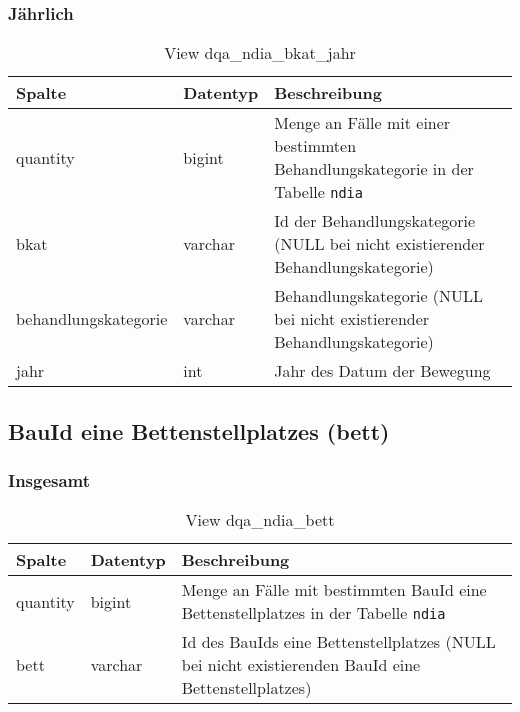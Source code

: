 \subsubsection{Jährlich} \label{subsubsec:behKatJ}

\begin{table}[ht]
	\centering   
	\caption{View dqa\_ndia\_bkat\_jahr}
	\label{tab:beweBkatJahr}
	\begin{tabular}{||l|l|p{10cm}||}   		
		\hline
		Spalte & Datentyp & Beschreibung \\ [0.5ex]
		\hline\hline
		quantity & bigint & Menge an Fälle mit einer bestimmten Behandlungskategorie in der Tabelle \texttt{ndia} \\
		\hline
		bkat & varchar & Id der Behandlungskategorie (NULL bei nicht existierender Behandlungskategorie)\\
		\hline
		behandlungskategorie & varchar & Behandlungskategorie (NULL bei nicht existierender Behandlungskategorie)\\
		\hline
		jahr & int &  Jahr des Datum der Bewegung \\
		\hline
		
	\end{tabular}
\end{table}

\newpage

\subsection{BauId eine Bettenstellplatzes (bett)} \label{subsec:bett}

\subsubsection{Insgesamt} \label{subsubsec:bettI}

\begin{table}[ht]
	\centering   
	\caption{View dqa\_ndia\_bett}
	\label{tab:beweBettAll}
	\begin{tabular}{||l|l|p{10cm}||}   		
		\hline
		Spalte & Datentyp & Beschreibung \\ [0.5ex]
		\hline\hline
		quantity & bigint & Menge an Fälle mit bestimmten BauId eine Bettenstellplatzes in der Tabelle \texttt{ndia} \\
		\hline
		bett & varchar & Id des BauIds eine Bettenstellplatzes (NULL bei nicht existierenden BauId eine Bettenstellplatzes)\\
		\hline
		
	\end{tabular}
\end{table}

